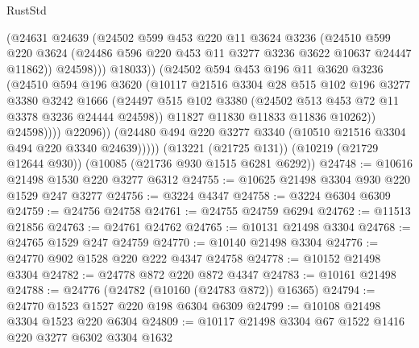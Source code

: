 \begin{lexlean}{RustStd}
\begin{coremodule}
                          (@24631
                            @24639
                            (@24502
                              @599
                              @453
                              @220
                              @11
                              @3624
                              @3236
                              (@24510
                                @599
                                @220
                                @3624
                                (@24486 @596 @220 @453 @11 @3277 @3236 @3622 @10637 @24447 @11862))
                              @24598)))
                        @18033))
                    (@24502
                      @594
                      @453
                      @196
                      @11
                      @3620
                      @3236
                      (@24510
                        @594
                        @196
                        @3620
                        (@10117
                          @21516
                          @3304
                          @28
                          @515
                          @102
                          @196
                          @3277
                          @3380
                          @3242
                          @1666
                          (@24497
                            @515
                            @102
                            @3380
                            (@24502 @513 @453 @72 @11 @3378 @3236 @24444 @24598))
                          @11827
                          @11830
                          @11833
                          @11836
                          @10262))
                      @24598))))
              @22096))
          (@24480 @494 @220 @3277 @3340 (@10510 @21516 @3304 @494 @220 @3340 @24639)))))
    (@13221 (@21725 @131))
    (@10219 (@21729 @12644 @930))
    (@10085 (@21736 @930 @1515 @6281 @6292))
@24748 := @10616 @21498 @1530 @220 @3277 @6312
@24755 := @10625 @21498 @3304 @930 @220 @1529 @247 @3277
@24756 := @3224 @4347
@24758 := @3224 @6304 @6309
@24759 := @24756 @24758
@24761 := @24755 @24759 @6294
@24762 := @11513 @21856
@24763 := @24761 @24762
@24765 := @10131 @21498 @3304
@24768 := @24765 @1529 @247 @24759
@24770 := @10140 @21498 @3304
@24776 := @24770 @902 @1528 @220 @222 @4347 @24758
@24778 := @10152 @21498 @3304
@24782 := @24778 @872 @220 @872 @4347
@24783 := @10161 @21498
@24788 := @24776 (@24782 (@10160 (@24783 @872)) @16365)
@24794 := @24770 @1523 @1527 @220 @198 @6304 @6309
@24799 := @10108 @21498 @3304 @1523 @220 @6304
@24809 := @10117 @21498 @3304 @67 @1522 @1416 @220 @3277 @6302 @3304 @1632

\end{coremodule}
\end{lexlean}
